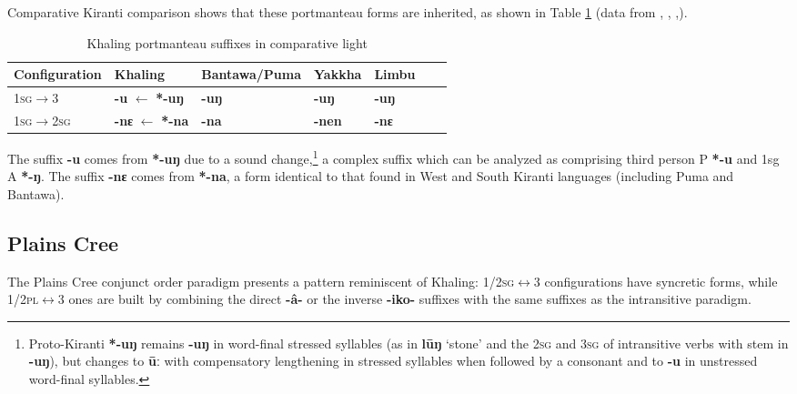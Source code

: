 \documentclass{article}
\newcommand{\ipa}[1]{{\phon\textbf{#1}}}
\begin{document}
Comparative Kiranti comparison shows that these portmanteau forms are inherited, as shown in Table \ref{tab:kiranti} (data from \citealt{driem87}, \citealt{doornenbal09},  \citealt{bickel07puma},\citealt{schackow15yakkha}). 


\begin{table}[H]
\caption{Khaling portmanteau suffixes in comparative light} \label{tab:kiranti} \centering
\begin{tabular}{lllllll}
\toprule
Configuration &  Khaling & Bantawa/Puma & Yakkha& Limbu \\
\midrule
\textsc{1sg$\rightarrow$3} & \ipa{-u} $\leftarrow$ \ipa{*-uŋ} & \ipa{-uŋ} & \ipa{-uŋ} &\ipa{-uŋ} \\
\textsc{1sg$\rightarrow$2sg} &  \ipa{-nɛ} $\leftarrow$ \ipa{*-na} &  \ipa{-na} &  \ipa{-nen} & \ipa{-nɛ} & \\
 \bottomrule
\end{tabular}
\end{table}

The suffix \ipa{-u} comes from \ipa{*-uŋ} due to a sound change,\footnote{Proto-Kiranti \ipa{*-uŋ} remains \ipa{-uŋ} in word-final stressed syllables (as in \ipa{lūŋ} `stone' and the \textsc{2sg} and \textsc{3sg} of intransitive verbs with stem in \ipa{-uŋ}), but changes to \ipa{ūː} with compensatory lengthening in stressed syllables when followed by a consonant and to \ipa{-u} in unstressed word-final syllables. } a complex suffix which can be analyzed as comprising third person P \ipa{*-u} and 1sg A \ipa{*-ŋ}. The suffix \ipa{-nɛ} comes from \ipa{*-na}, a form identical to that found in West and South Kiranti languages (including Puma and Bantawa).


\subsection{Plains Cree} \label{sec:cree}
The Plains Cree conjunct order paradigm presents  a pattern reminiscent of Khaling: 1/\textsc{2sg$\leftrightarrow$3} configurations have syncretic forms, while 1/\textsc{2pl$\leftrightarrow$3} ones are built by combining the direct \ipa{-â-} or the inverse \ipa{-iko-} suffixes with the same suffixes as the intransitive paradigm.
\end{document}
